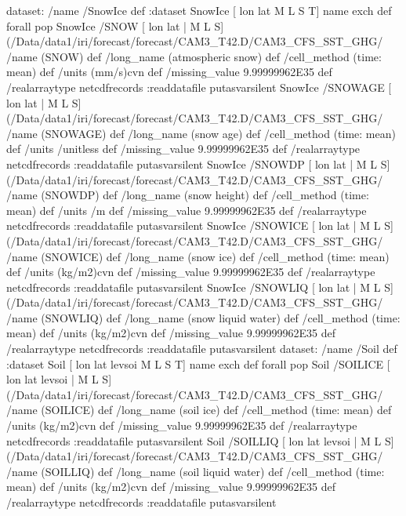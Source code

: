 \begin{ingrid}
dataset: /name /SnowIce def :dataset
SnowIce [ lon lat M L S T] {name exch def} forall pop
SnowIce /SNOW{
[ lon lat | M L S] (/Data/data1/iri/forecast/forecast/CAM3_T42.D/CAM3_CFS_SST_GHG/%
/name (SNOW) def
 /long_name (atmospheric snow) def
 /cell_method (time: mean) def
 /units (mm/s)cvn def
 /missing_value 9.99999962E35 def
 /realarraytype netcdfrecords :readdatafile
}putasvarsilent
SnowIce /SNOWAGE{
[ lon lat | M L S] (/Data/data1/iri/forecast/forecast/CAM3_T42.D/CAM3_CFS_SST_GHG/%
/name (SNOWAGE) def
 /long_name (snow age) def
 /cell_method (time: mean) def
 /units /unitless def
 /missing_value 9.99999962E35 def
 /realarraytype netcdfrecords :readdatafile
}putasvarsilent
SnowIce /SNOWDP{
[ lon lat | M L S] (/Data/data1/iri/forecast/forecast/CAM3_T42.D/CAM3_CFS_SST_GHG/%
/name (SNOWDP) def
 /long_name (snow height) def
 /cell_method (time: mean) def
 /units /m def
 /missing_value 9.99999962E35 def
 /realarraytype netcdfrecords :readdatafile
}putasvarsilent
SnowIce /SNOWICE{
[ lon lat | M L S] (/Data/data1/iri/forecast/forecast/CAM3_T42.D/CAM3_CFS_SST_GHG/%
/name (SNOWICE) def
 /long_name (snow ice) def
 /cell_method (time: mean) def
 /units (kg/m2)cvn def
 /missing_value 9.99999962E35 def
 /realarraytype netcdfrecords :readdatafile
}putasvarsilent
SnowIce /SNOWLIQ{
[ lon lat | M L S] (/Data/data1/iri/forecast/forecast/CAM3_T42.D/CAM3_CFS_SST_GHG/%
/name (SNOWLIQ) def
 /long_name (snow liquid water) def
 /cell_method (time: mean) def
 /units (kg/m2)cvn def
 /missing_value 9.99999962E35 def
 /realarraytype netcdfrecords :readdatafile
}putasvarsilent
dataset: /name /Soil def :dataset
Soil [ lon lat levsoi M L S T] {name exch def} forall pop
Soil /SOILICE{
[ lon lat levsoi | M L S] (/Data/data1/iri/forecast/forecast/CAM3_T42.D/CAM3_CFS_SST_GHG/%
/name (SOILICE) def
 /long_name (soil ice) def
 /cell_method (time: mean) def
 /units (kg/m2)cvn def
 /missing_value 9.99999962E35 def
 /realarraytype netcdfrecords :readdatafile
}putasvarsilent
Soil /SOILLIQ{
[ lon lat levsoi | M L S] (/Data/data1/iri/forecast/forecast/CAM3_T42.D/CAM3_CFS_SST_GHG/%
/name (SOILLIQ) def
 /long_name (soil liquid water) def
 /cell_method (time: mean) def
 /units (kg/m2)cvn def
 /missing_value 9.99999962E35 def
 /realarraytype netcdfrecords :readdatafile
}putasvarsilent


\end{ingrid}
